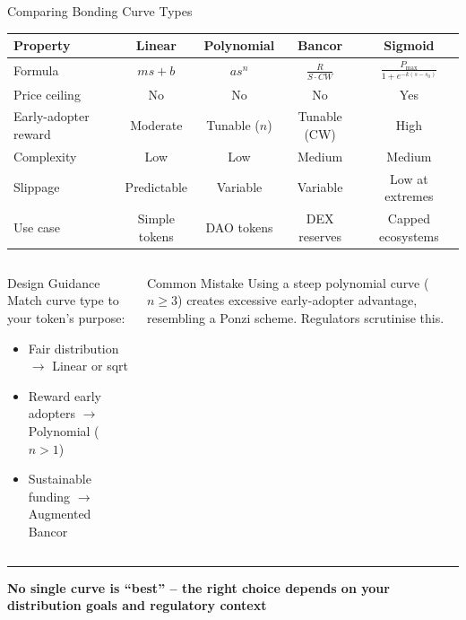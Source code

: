 \documentclass[8pt,aspectratio=169]{beamer}
\newcommand{\bottomnote}[1]{\vfill\vspace{-2mm}\textcolor{mllavender2}{\rule{\textwidth}{0.4pt}}\vspace{1mm}\footnotesize\textbf{#1}}
\begin{document}
\begin{frame}{Comparing Bonding Curve Types}
\footnotesize
\begin{tabular}{lcccc}
\toprule
\textbf{Property} & \textbf{Linear} & \textbf{Polynomial} & \textbf{Bancor} & \textbf{Sigmoid} \\
\midrule
Formula & $ms + b$ & $as^n$ & $\frac{R}{S \cdot CW}$ & $\frac{P_{\max}}{1+e^{-k(s-s_0)}}$ \\[3mm]
Price ceiling & No & No & No & Yes \\
Early-adopter reward & Moderate & Tunable ($n$) & Tunable (CW) & High \\
Complexity & Low & Low & Medium & Medium \\
Slippage & Predictable & Variable & Variable & Low at extremes \\
Use case & Simple tokens & DAO tokens & DEX reserves & Capped ecosystems \\
\bottomrule
\end{tabular}
\vspace{3mm}
\begin{columns}[T]
\begin{exampleblock}{\footnotesize Design Guidance}
\footnotesize
Match curve type to your token's purpose:
\begin{itemize}
  \item Fair distribution $\rightarrow$ Linear or sqrt
  \item Reward early adopters $\rightarrow$ Polynomial ($n > 1$)
  \item Sustainable funding $\rightarrow$ Augmented Bancor
\end{itemize}
\end{exampleblock}

\begin{alertblock}{\footnotesize Common Mistake}
\footnotesize
Using a steep polynomial curve ($n \geq 3$) creates excessive early-adopter advantage, resembling a Ponzi scheme. Regulators scrutinise this.
\end{alertblock}
\end{columns}
\bottomnote{No single curve is ``best'' -- the right choice depends on your distribution goals and regulatory context}
\end{frame}
\end{document}
